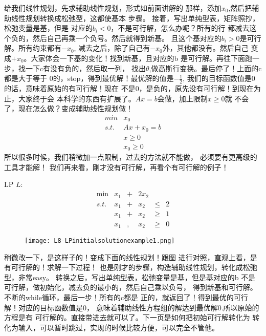 {{}
{
	给我们线性规划，先求辅助线性规划，形式如前面讲解的
	那样，添加$x_0$,然后把辅助线性规划转换成松弛型，这都使基本
	步骤。
}
{
	接着，写出单纯型表，矩阵照抄，松弛变量是基，但是
	对应的$b_i < 0$，不是可行解，怎么办呢？所有的行
	都减去这个负的，然后自己再乘一个负号。然后就得到新基。
	且这个基对应的$b_i > 0$是可行解。所有约束都有$-x_0$,
	减去之后，除了自己有$-x_0$外，其他都没有。然后自己
	变成$+x_0$。大家体会一下基的变化！找到新基，且对应的b
	是可行解。再往下面跑一步，找一下c有没有负的，然后取一列，
	找出$\theta$,做高斯行变换。最后停了！上面的c都是大于等于
	0的，stop，得到最优解！最优解的值是$-\frac{1}{2}$,
	我们的目标函数值是0的话，意味着原始的有可行解！现在
	不是0，是负的，原先没有可行解！到现在为止，大家终于会
	本科学的东西有扩展了。$Ax = b$会做，加上限制$x \geq 0$就
	不会了，现在怎么做？变成辅助线性规划做！
	\[
	\begin{array}{ll}
	min & x_{0} \\
	s.t. & Ax + x_{0} = b \\
	& x \geq 0 \\
	& x_{0} \geq 0
	\end{array}
	\]
	所以很多时候，我们稍微加一点限制，过去的方法就不能做，
	必须要有更高级的工具才能解！
}
{
	我们再来看，刚才没有可行解，再看个有可行解的例子！
}
{

		\begin{small}
			LP $L$:
			\[
			\begin{array}{rrrrrrl}
			\min &   x_1 & + &2  x_2 & \\
			s.t. &   x_1 & + & x_2 & \leq & 2   \\
			&    x_1 & + & x_2 & \geq & 1   \\
			&   x_1 &,& x_2 & \geq & 0
			\end{array} \nonumber
			\]
		\end{small}
		\begin{figure}
			\texttt{[image: L8-LPinitialsolutionexample1.png]}
		\end{figure}

}
{
	稍微改一下，是这样子的！变成下面的线性规划！跟图
	进行对照，直观上看，是有可行解的！求解一下过程！
}
{
	也是刚才的步骤，构造辅助线性规划，转化成松弛型，非常easy。
}
{
	转换之后，写出单纯型表，松弛变量是基，但是基对应的b
	不是可行解，做初始化，减去负的最小的，然后自己乘以负号，
	得到新基和可行解。不断的while循环，最后一步！所有的c都是
	正的，就返回了！得到最优的可行解！对应的目标函数值是0，
	意味着辅助线性方程组的解达到最优解0.所以原始的方程是有
	可行解的。直接带进去就可以了。下一页是如何把初始可行解转化为
	转化为输入，可以暂时跳过，实现的时候比较方便，可以完全不管他。
}


}
